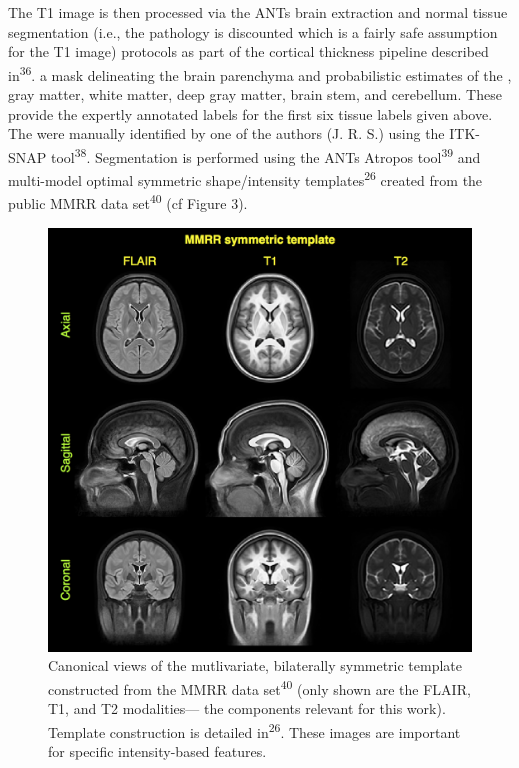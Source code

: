 \documentclass[11pt,]{article}
\begin{document}
The T1 image is then processed via the ANTs brain extraction and normal
tissue segmentation (i.e., the pathology is discounted which is a fairly
safe assumption for the T1 image) protocols as part of the cortical
thickness pipeline described in\textsuperscript{36}.
 a mask delineating the brain
parenchyma and probabilistic estimates of the
, gray matter, white
matter, deep gray matter, brain stem, and cerebellum. These provide the
expertly annotated labels for the first six tissue labels given above.
The  were manually
identified by one of the authors (J. R. S.) using the ITK-SNAP
tool\textsuperscript{38}. Segmentation is performed using the ANTs
Atropos tool\textsuperscript{39} and multi-model optimal symmetric
shape/intensity templates\textsuperscript{26} created from the public
MMRR data set\textsuperscript{40} (cf Figure 3).

\begin{figure}[htbp]
\centering
\includegraphics{Figures/MMRR.png}
\caption{Canonical views of the mutlivariate, bilaterally symmetric
template constructed from the MMRR data set\textsuperscript{40} (only
shown are the FLAIR, T1, and T2 modalities--- the components relevant
for this work). Template construction is detailed
in\textsuperscript{26}. These images are important for specific
intensity-based features.}
\end{figure}
\end{document}
